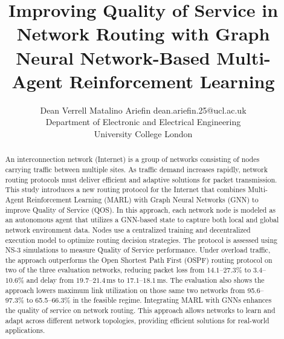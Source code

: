 \documentclass[10pt]{article} %
\title{Improving Quality of Service in Network Routing  with Graph Neural Network-Based Multi-Agent Reinforcement Learning}
\author{\name Dean Verrell Matalino Ariefin \email dean.ariefin.25@ucl.ac.uk \\
      \addr Department of Electronic and Electrical Engineering\\
      University College London}
\begin{document}
\maketitle

\begin{abstract}
An interconnection network (Internet) is a group of networks consisting of nodes carrying traffic between multiple sites. As traffic demand increases rapidly, network routing protocols must deliver efficient and adaptive solutions for packet transmission. This study introduces a new routing protocol for the Internet that combines Multi-Agent Reinforcement Learning (MARL) with Graph Neural Networks (GNN) to improve Quality of Service (QOS). In this approach, each network node is modeled as an autonomous agent that utilizes a GNN-based state to capture both local and global network environment data. Nodes use a centralized training and decentralized execution model to optimize routing decision strategies. The protocol is assessed using NS-3 simulations to measure Quality of Service performance. Under overload traffic, the approach outperforms the Open Shortest Path First (OSPF) routing protocol on two of the three evaluation networks, reducing packet loss from $14.1$--$27.3\%$ to $3.4$--$10.6\%$ and delay from $19.7$--$21.4$\,ms to $17.1$--$18.1$\,ms. The evaluation also shows the approach lowers maximum link utilization on those same two networks from 95.6–97.3\% to 65.5–66.3\% in the feasible regime. Integrating MARL with GNNs enhances the quality of service on network routing. This approach allows networks to learn and adapt across different network topologies, providing efficient solutions for real-world applications.
\end{abstract}





 
% 





\appendix

\end{document}
